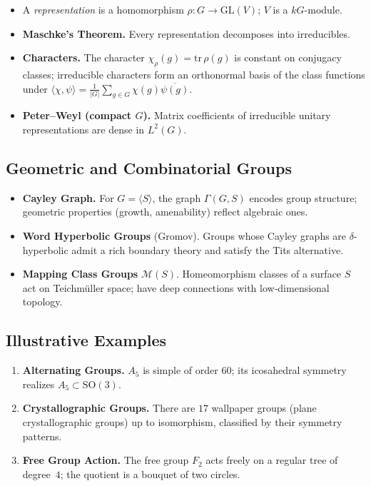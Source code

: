 \begin{itemize}
    \item A \emph{representation} is a homomorphism \(\rho:G\to \mathrm{GL}(V)\);  
          \(V\) is a \(kG\)-module.
    \item \textbf{Maschke’s Theorem.}  
          Every representation decomposes into irreducibles.
    \item \textbf{Characters.}  
          The character \(\chi_{\rho}(g)=\mathrm{tr}\,\rho(g)\) is constant on conjugacy classes;  
          irreducible characters form an orthonormal basis of the class functions under  
          \(\langle \chi,\psi\rangle=\frac{1}{|G|}\sum_{g\in G}\chi(g)\overline{\psi(g)}\).
    \item \textbf{Peter–Weyl (compact \(G\)).}  
          Matrix coefficients of irreducible unitary representations are dense in \(L^{2}(G)\).
\end{itemize}

\subsection{Geometric and Combinatorial Groups}

\begin{itemize}
    \item \textbf{Cayley Graph.}  
          For \(G=\langle S\rangle\), the graph \(\Gamma(G,S)\) encodes group structure;  
          geometric properties (growth, amenability) reflect algebraic ones.
    \item \textbf{Word Hyperbolic Groups} (Gromov).  
          Groups whose Cayley graphs are \(\delta\)-hyperbolic admit 
          a rich boundary theory and satisfy the Tits alternative.
    \item \textbf{Mapping Class Groups} \(\mathcal{M}(S)\).  
          Homeomorphism classes of a surface \(S\) act on Teichmüller space;  
          have deep connections with low‑dimensional topology.
\end{itemize}

\subsection{Illustrative Examples}

\begin{enumerate}
    \item \textbf{Alternating Groups.}  
          \(A_{5}\) is simple of order \(60\);  
          its icosahedral symmetry realizes \(A_{5}\subset \mathrm{SO}(3)\).
    \item \textbf{Crystallographic Groups.}  
          There are \(17\) wallpaper groups (plane crystallographic groups) up to isomorphism, classified by their symmetry patterns.
    \item \textbf{Free Group Action.}  
          The free group \(F_{2}\) acts freely on a regular tree of degree~\(4\);  
          the quotient is a bouquet of two circles.
\end{enumerate}
